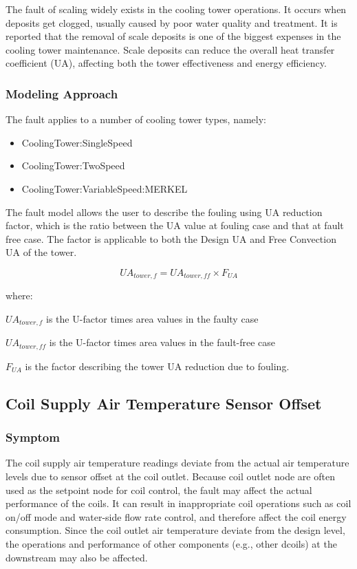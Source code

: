 The fault of scaling widely exists in the cooling tower operations. It occurs when deposits get clogged, usually caused by poor water quality and treatment. It is reported that the removal of scale deposits is one of the biggest expenses in the cooling tower maintenance. Scale deposits can reduce the overall heat transfer coefficient (UA), affecting both the tower effectiveness and energy efficiency.

\subsubsection{Modeling Approach}

The fault applies to a number of cooling tower types, namely:

\begin{itemize}
\tightlist
\item
  CoolingTower:SingleSpeed
\item
  CoolingTower:TwoSpeed
\item
  CoolingTower:VariableSpeed:MERKEL
\end{itemize}

The fault model allows the user to describe the fouling using UA reduction factor, which is the ratio between the UA value at fouling case and that at fault free case. The factor is applicable to both the Design UA and Free Convection UA of the tower. 

\begin{equation}
UA_{tower,f} = UA_{tower,ff} \times F_{UA}
\end{equation}

where:

\(UA_{tower,f}\) is the U-factor times area values in the faulty case

\(UA_{tower,ff}\) is the U-factor times area values in the fault-free case

\(F_{UA}\) is the factor describing the tower UA reduction due to fouling.


\subsection{Coil Supply Air Temperature Sensor Offset}\label{coil-supply-air-temperature-sensor-offset}

\subsubsection{Symptom}

The coil supply air temperature readings deviate from the actual air temperature levels due to sensor offset at the coil outlet. Because coil outlet node are often used as the setpoint node for coil control, the fault may affect the actual performance of the coils. It can result in inappropriate coil operations such as coil on/off mode and water-side flow rate control, and therefore affect the coil energy consumption. Since the coil outlet air temperature deviate from the design level, the operations and performance of other components (e.g., other dcoils) at the downstream may also be affected.

